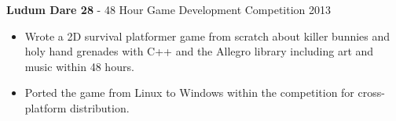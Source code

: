 \documentclass[10pt]{article}
\begin{document}
\begin{adjustwidth}{16pt}{0pt}
\vspace{8pt}
\noindent\textbf{Ludum Dare 28} - 48 Hour Game Development Competition
\hfill 2013
\begin{itemize}
	\setlength\itemsep{0pt}
	\item Wrote a 2D survival platformer game from scratch about killer bunnies
	and holy hand grenades with C++ and the Allegro library including art and
	music within 48 hours.
	\item  Ported the game from Linux to Windows within the competition for
	cross-platform distribution.
\end{itemize}


\end{adjustwidth}
\end{document}
